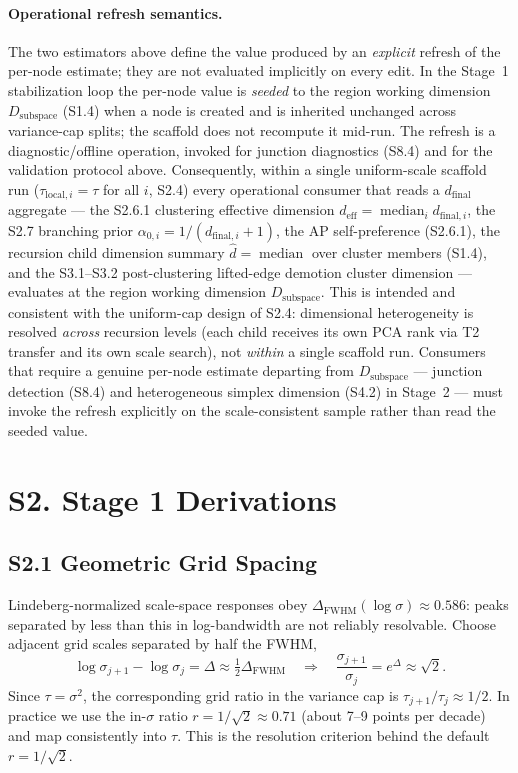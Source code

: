 \documentclass[11pt]{article}
\begin{document}
\paragraph{Operational refresh semantics.}
The two estimators above define the value produced by an \emph{explicit} refresh
of the per-node estimate; they are not evaluated implicitly on every edit. In the
Stage~1 stabilization loop the per-node value is \emph{seeded} to the region
working dimension $D_{\mathrm{subspace}}$ (S1.4) when a node is created and is
inherited unchanged across variance-cap splits; the scaffold does not recompute
it mid-run. The refresh is a diagnostic/offline operation, invoked for junction
diagnostics (S8.4) and for the validation protocol above. Consequently, within a
single uniform-scale scaffold run ($\tau_{\mathrm{local},i}=\tau$ for all $i$,
S2.4) every operational consumer that reads a $d_{\mathrm{final}}$ aggregate ---
the S2.6.1 clustering effective dimension
$d_{\mathrm{eff}}=\operatorname{median}_i d_{\mathrm{final},i}$, the S2.7 branching
prior $\alpha_{0,i}=1/(d_{\mathrm{final},i}+1)$, the AP self-preference (S2.6.1),
the recursion child dimension summary $\hat d=\operatorname{median}$ over cluster
members (S1.4), and the S3.1--S3.2 post-clustering lifted-edge demotion cluster
dimension --- evaluates at the region working dimension $D_{\mathrm{subspace}}$.
This is intended and consistent with the uniform-cap design of S2.4: dimensional
heterogeneity is resolved \emph{across} recursion levels (each child receives its
own PCA rank via T2 transfer and its own scale search), not \emph{within} a single
scaffold run. Consumers that require a genuine per-node estimate departing from
$D_{\mathrm{subspace}}$ --- junction detection (S8.4) and heterogeneous simplex
dimension (S4.2) in Stage~2 --- must invoke the refresh explicitly on the
scale-consistent sample rather than read the seeded value.

\section*{S2. Stage 1 Derivations}

\subsection*{S2.1 Geometric Grid Spacing}
\label{sec:si-grid-spacing}
Lindeberg-normalized scale-space responses obey $\Delta_{\mathrm{FWHM}}(\log\sigma)\approx 0.586$: peaks separated by less than this in log-bandwidth are not reliably resolvable. Choose adjacent grid scales separated by half the FWHM,
\[
\log\sigma_{j+1}-\log\sigma_j
=\Delta\approx\tfrac12\Delta_{\mathrm{FWHM}}
\quad\Longrightarrow\quad
\frac{\sigma_{j+1}}{\sigma_j}=e^\Delta\approx\sqrt{2}.
\]
Since $\tau=\sigma^2$, the corresponding grid ratio in the variance cap is $\tau_{j+1}/\tau_j\approx 1/2$. In practice we use the in-$\sigma$ ratio $r=1/\sqrt{2}\approx 0.71$ (about 7--9 points per decade) and map consistently into $\tau$. This is the resolution criterion behind the default $r=1/\sqrt{2}$.
\end{document}
